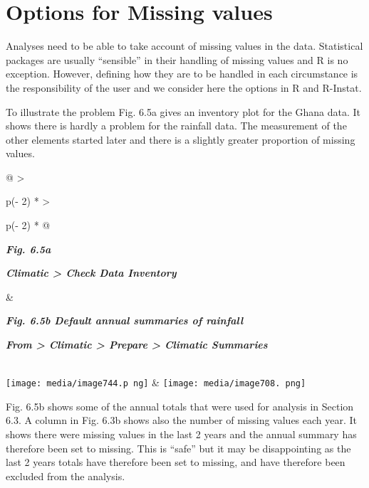 \documentclass[
  letterpaper,
  DIV=11,
  numbers=noendperiod]{scrreprt}
\begin{document}
\section{Options for Missing values}\label{options-for-missing-values}

Analyses need to be able to take account of missing values in the data.
Statistical packages are usually ``sensible'' in their handling of
missing values and R is no exception. However, defining how they are to
be handled in each circumstance is the responsibility of the user and we
consider here the options in R and R-Instat.

To illustrate the problem Fig. 6.5a gives an inventory plot for the
Ghana data. It shows there is hardly a problem for the rainfall data.
The measurement of the other elements started later and there is a
slightly greater proportion of missing values.

\begin{longtable}[]{@{}
  >{\raggedright\arraybackslash}p{(\columnwidth - 2\tabcolsep) * }
  >{\raggedright\arraybackslash}p{(\columnwidth - 2\tabcolsep) * }@{}}
\toprule\noalign{}
\begin{minipage}[b]{\linewidth}\raggedright
\textbf{\emph{Fig. 6.5a}}

\textbf{\emph{Climatic \textgreater{} Check Data Inventory}}
\end{minipage} & \begin{minipage}[b]{\linewidth}\raggedright
\textbf{\emph{Fig. 6.5b Default annual summaries of rainfall}}

\textbf{\emph{From \textgreater{} Climatic \textgreater{} Prepare
\textgreater{} Climatic Summaries}}
\end{minipage} \\
\midrule\noalign{}
\endhead
\bottomrule\noalign{}
\endlastfoot
\texttt{[image: media/image744.p ng]}
&
\texttt{[image: media/image708. png]} \\
\end{longtable}

Fig. 6.5b shows some of the annual totals that were used for analysis in
Section 6.3. A column in Fig. 6.3b shows also the number of missing
values each year. It shows there were missing values in the last 2 years
and the annual summary has therefore been set to missing. This is
``safe'' but it may be disappointing as the last 2 years totals have
therefore been set to missing, and have therefore been excluded from the
analysis.
\end{document}
